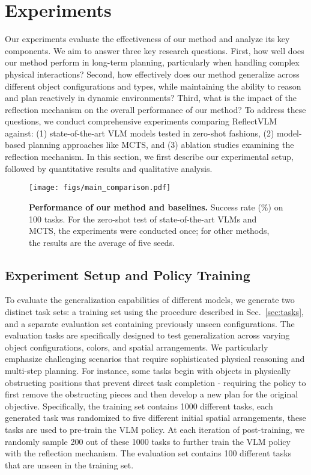 \section{Experiments}\label{sec:experiment}
Our experiments evaluate the effectiveness of our method and analyze its key components. We aim to answer three key research questions. First, how well does our method perform in long-term planning, particularly when handling complex physical interactions? Second, how effectively does our method generalize across different object configurations and types, while maintaining the ability to reason and plan reactively in dynamic environments? Third, what is the impact of the reflection mechanism on the overall performance of our method?
To address these questions, we conduct comprehensive experiments comparing ReflectVLM against: (1) state-of-the-art VLM models tested in zero-shot fashions, (2) model-based planning approaches like MCTS, and (3) ablation studies examining the reflection mechanism. In this section, we first describe our experimental setup, followed by quantitative results and qualitative analysis.


\begin{figure*}[t!]
    \centering
    \texttt{[image: figs/main\_comparison.pdf]}
    \vspace{-0.1in}
    \caption{\textbf{Performance of our method and baselines.} Success rate (\%) on 100 tasks. For the zero-shot test of state-of-the-art VLMs and MCTS, the experiments were conducted once; for other methods, the results are the average of five seeds.}
    \label{fig:main_comparison}
\end{figure*}

\subsection{Experiment Setup and Policy Training}
To evaluate the generalization capabilities of different models, we generate two distinct task sets: a training set using the procedure described in Sec.~\ref{sec:tasks}, and a separate evaluation set containing previously unseen configurations. The evaluation tasks are specifically designed to test generalization across varying object configurations, colors, and spatial arrangements. We particularly emphasize challenging scenarios that require sophisticated physical reasoning and multi-step planning. For instance, some tasks begin with objects in physically obstructing positions that prevent direct task completion - requiring the policy to first remove the obstructing pieces and then develop a new plan for the original objective.
Specifically, the training set contains 1000 different tasks, each generated task was randomized to five different initial spatial arrangements, these tasks are used to pre-train the VLM policy. At each iteration of post-training, we randomly sample 200 out of these 1000 tasks to further train the VLM policy with the reflection mechanism.
The evaluation set contains 100 different tasks that are unseen in the training set.

